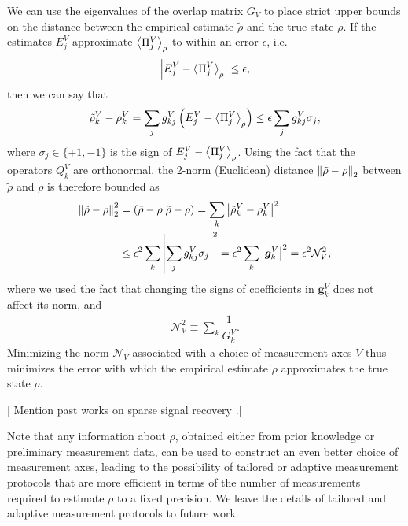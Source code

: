 \documentclass[notitlepage,twocolumn]{revtex4-2}
\newcommand{\f}[2]{\dfrac{#1}{#2}} %
\newcommand{\p}[1]{\left(#1\right)} %
\renewcommand{\set}[1]{\{#1\}} %
\newcommand{\bk}{\Braket} %
\renewcommand{\v}{\bm} %
\newcommand{\1}{\mathds{1}}
\newcommand{\N}{\mathcal{N}}
\def\obk#1{\mathinner{({#1})}}
\newcommand{\red}[1]{{\color{red} #1}}
\begin{document}
We can use the eigenvalues of the overlap matrix $G_V$ to place strict upper bounds on the distance between the empirical estimate $\tilde\rho$ and the true state $\rho$.
If the estimates $E^V_j$ approximate $\bk{\Pi^V_j}_\rho$ to within an error $\epsilon$, i.e.
\begin{align}
  \abs{E^V_j-\bk{\Pi^V_j}_\rho} \le \epsilon,
\end{align}
then we can say that
\begin{align}
  \tilde\rho^V_k-\rho^V_k
  = \sum_j g_{kj}^V \p{E^V_j-\bk{\Pi^V_j}_\rho}
  \le \epsilon \sum_j g_{kj}^V \sigma_j,
\end{align}
where $\sigma_j\in\set{+1,-1}$ is the sign of $E^V_j-\bk{\Pi^V_j}_\rho$.
Using the fact that the operators $Q^V_k$ are orthonormal, the 2-norm (Euclidean) distance $\norm{\tilde\rho-\rho}_2$ between $\tilde\rho$ and $\rho$ is therefore bounded as
\begin{align}
  \norm{\tilde\rho-\rho}_2^2
  &= \obk{\tilde\rho-\rho|\tilde\rho-\rho}
  = \sum_k \abs{\tilde\rho^V_k - \rho^V_k}^2 \nonumber \\
  &\le \epsilon^2 \sum_k \abs{\sum_j g_{kj}^V \sigma_j}^2
  = \epsilon^2 \sum_k \abs{\v g^V_k}^2
  = \epsilon^2 \N_V^2,
\end{align}
where we used the fact that changing the signs of coefficients in $\v g^V_k$ does not affect its norm, and
\begin{align}
  \N_V^2 \equiv \sum_k \f1{G^V_k}.
\end{align}
Minimizing the norm $\N_V$ associated with a choice of measurement axes $V$ thus minimizes the error with which the empirical estimate $\tilde\rho$ approximates the true state $\rho$.




\vspace{3cm}


[\red{Mention past works on sparse signal recovery \cite{rauhut2011sparse, alem2012sparse}.}]

Note that any information about $\rho$, obtained either from prior knowledge or preliminary measurement data, can be used to construct an even better choice of measurement axes, leading to the possibility of tailored or adaptive measurement protocols \cite{pereira2018adaptive} that are more efficient in terms of the number of measurements required to estimate $\rho$ to a fixed precision.
We leave the details of tailored and adaptive measurement protocols to future work.


\end{document}

